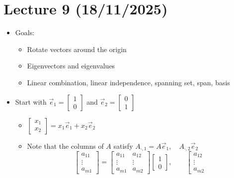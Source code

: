 \documentclass{article}
\begin{document}
\section{Lecture 9 (18/11/2025)}
\begin{itemize}
    \item Goals:
    \begin{itemize}
        \item Rotate vectors around the origin
        \item Eigenvectors and eigenvalues
        \item Linear combination, linear independence, spanning set, span, basis
    \end{itemize}
    \item Start with $\vec{e}_1 = \left[ \begin{array}{c}
        1 \\
        0
    \end{array}\right]$ and $\vec{e}_2 = \left[ \begin{array}{c}
        0 \\
        1
    \end{array}\right]$
    \begin{itemize}
        \item $\left[ \begin{array}{c}
            x_1 \\
            x_2
        \end{array}\right] = x_1\vec{e}_1 + x_2 \vec{e}_2$
        \item Note that the columns of $A$ satisfy $A_{\cdot,1} = A\vec{e}_1, \quad A_{\cdot,2} \vec{e}_2$
        \[
        \left[ \begin{array}{c}
            a_{11} \\
            \vdots \\
            a_{m1}
        \end{array}\right] = \left[ \begin{array}{cc}
            a_{11} & a_{12} \\
            \vdots & \vdots \\
            a_{m1} & a_{m2}
        \end{array}\right] \left[ \begin{array}{c}
            1 \\
            0
        \end{array}\right], \qquad \left[ \begin{array}{cc}
            a_{12} \\ \vdots \\ a_{m2}

\end{array}\]
\end{itemize}
\end{itemize}
\end{document}

